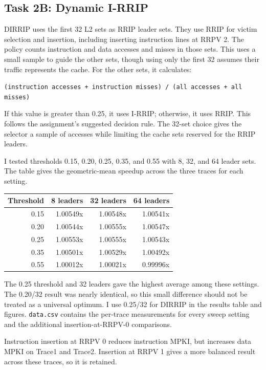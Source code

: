 \documentclass[10pt]{article}
\begin{document}
\subsection*{Task 2B: Dynamic I-RRIP}

DIRRIP uses the first 32 L2 sets as RRIP leader sets. They use RRIP for victim selection and insertion, including inserting instruction lines at RRPV 2. The policy counts instruction and data accesses and misses in those sets. This uses a small sample to guide the other sets, though using only the first 32 assumes their traffic represents the cache. For the other sets, it calculates:

\texttt{(instruction accesses + instruction misses) / (all accesses + all misses)}

If this value is greater than 0.25, it uses I-RRIP; otherwise, it uses RRIP. This follows the assignment's suggested decision rule. The 32-set choice gives the selector a sample of accesses while limiting the cache sets reserved for the RRIP leaders.

I tested thresholds 0.15, 0.20, 0.25, 0.35, and 0.55 with 8, 32, and 64 leader sets. The table gives the geometric-mean speedup across the three traces for each setting.

\begin{table}[H]
\centering
\begin{tabular}{rrrr}
\toprule
Threshold & 8 leaders & 32 leaders & 64 leaders \\
\midrule
0.15 & 1.00549x & 1.00548x & 1.00541x \\
0.20 & 1.00544x & 1.00555x & 1.00547x \\
0.25 & 1.00553x & 1.00555x & 1.00543x \\
0.35 & 1.00501x & 1.00529x & 1.00492x \\
0.55 & 1.00012x & 1.00021x & 0.99996x \\
\bottomrule
\end{tabular}
\end{table}

The 0.25 threshold and 32 leaders gave the highest average among these settings. The 0.20/32 result was nearly identical, so this small difference should not be treated as a universal optimum. I use 0.25/32 for DIRRIP in the results table and figures. \texttt{data.csv} contains the per-trace measurements for every sweep setting and the additional insertion-at-RRPV-0 comparisons.

Instruction insertion at RRPV 0 reduces instruction MPKI, but increases data MPKI on Trace1 and Trace2. Insertion at RRPV 1 gives a more balanced result across these traces, so it is retained.
\end{document}
